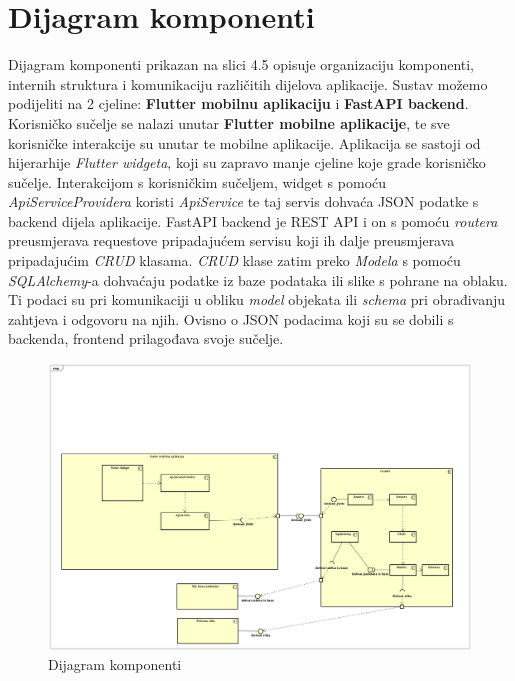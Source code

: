		\section{Dijagram komponenti}
		
		
			 
			 {Dijagram komponenti prikazan na slici 4.5 opisuje organizaciju komponenti, internih struktura i komunikaciju različitih dijelova aplikacije. Sustav možemo podijeliti na 2 cjeline: \textbf{Flutter mobilnu aplikaciju} i \textbf{FastAPI backend}. Korisničko sučelje se nalazi unutar \textbf{Flutter mobilne aplikacije}, te sve korisničke interakcije su unutar te mobilne aplikacije. Aplikacija se sastoji od hijerarhije \textit{Flutter widgeta}, koji su zapravo manje cjeline koje grade korisničko sučelje. Interakcijom s korisničkim sučeljem, widget s pomoću \textit{ApiServiceProvidera} koristi \textit{ApiService} te taj servis dohvaća JSON podatke s backend dijela aplikacije. FastAPI backend je REST API i on s pomoću \textit{routera} preusmjerava requestove pripadajućem servisu koji ih dalje preusmjerava pripadajućim \textit{CRUD} klasama. \textit{CRUD} klase zatim preko \textit{Modela} s pomoću \textit{SQLAlchemy}-a dohvaćaju podatke iz baze podataka ili slike s pohrane na oblaku. Ti podaci su pri komunikaciji u obliku \textit{model} objekata ili \textit{schema} pri obrađivanju zahtjeva i odgovoru na njih. Ovisno o JSON podacima koji su se dobili s backenda, frontend prilagođava svoje sučelje.}
			 \begin{figure}[H]
			 	\includegraphics[width=\textwidth]{slike/dijagramKomponenti.png}
			 	\caption{Dijagram komponenti}
			 	\label{fig:dijagramKomponenti}
			 \end{figure}